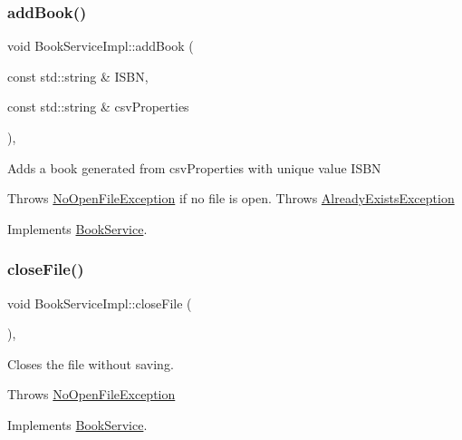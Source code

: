 \subsubsection{\texorpdfstring{add\+Book()}{addBook()}}
{\footnotesize\ttfamily void Book\+Service\+Impl\+::add\+Book (\begin{DoxyParamCaption}\item[{const std\+::string \&}]{I\+S\+BN,  }\item[{const std\+::string \&}]{csv\+Properties }\end{DoxyParamCaption})\hspace{0.3cm}{\ttfamily [override]}, {\ttfamily [virtual]}}

Adds a book generated from csv\+Properties with unique value I\+S\+BN

Throws \hyperlink{structNoOpenFileException}{No\+Open\+File\+Exception} if no file is open. Throws \hyperlink{classAlreadyExistsException}{Already\+Exists\+Exception} 

Implements \hyperlink{classBookService_a10744fb09191f0d2811d766aa1124931}{Book\+Service}.

\mbox{\label{classBookServiceImpl_abf8207579fffae1a2bd1003b8684d994}} 
\subsubsection{\texorpdfstring{close\+File()}{closeFile()}}
{\footnotesize\ttfamily void Book\+Service\+Impl\+::close\+File (\begin{DoxyParamCaption}{ }\end{DoxyParamCaption})\hspace{0.3cm}{\ttfamily [override]}, {\ttfamily [virtual]}}

Closes the file without saving.

Throws \hyperlink{structNoOpenFileException}{No\+Open\+File\+Exception} 

Implements \hyperlink{classBookService_af002fdac384bbaa9d6db2de419163c82}{Book\+Service}.

\mbox{\label{classBookServiceImpl_a650bd2918bbacfd628e1d399a1c82b48}} 
